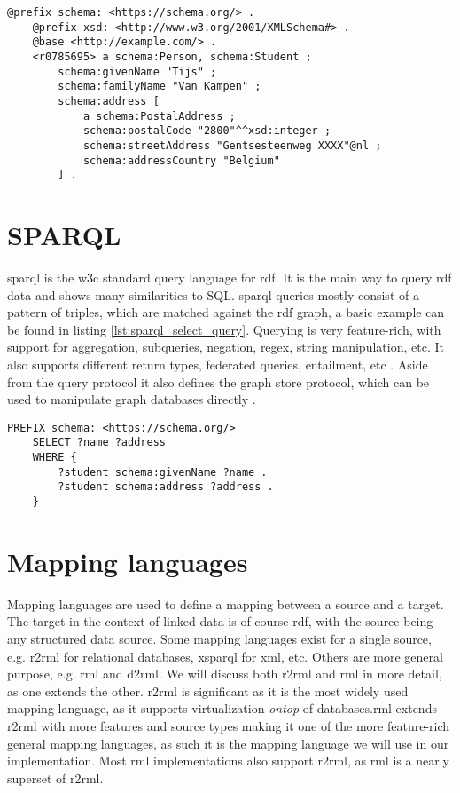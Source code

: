\begin{lstlisting}[caption={Basic turtle document using turtle features}, label={lst:basic_turtle_example_concise}, captionpos=b, breaklines=true]
    @prefix schema: <https://schema.org/> .
    @prefix xsd: <http://www.w3.org/2001/XMLSchema#> .
    @base <http://example.com/> .
    <r0785695> a schema:Person, schema:Student ;
        schema:givenName "Tijs" ;
        schema:familyName "Van Kampen" ;
        schema:address [
            a schema:PostalAddress ;
            schema:postalCode "2800"^^xsd:integer ;
            schema:streetAddress "Gentsesteenweg XXXX"@nl ;
            schema:addressCountry "Belgium"
        ] .
\end{lstlisting}


\section{SPARQL}
\acrfull{sparql} is the \acrshort{w3c} standard query language for \acrshort{rdf}. It is the main way to query \acrshort{rdf} data and shows many similarities to SQL. \acrshort{sparql} queries mostly consist of a pattern of triples, which are matched against the \acrshort{rdf} graph, a basic example can be found in listing \ref{lst:sparql_select_query}. Querying is very feature-rich, with support for aggregation, subqueries, negation, regex, string manipulation, etc. It also supports different return types, federated queries, entailment, etc \citep{SPARQL1.1QL}. Aside from the query protocol it also defines the graph store protocol, which can be used to manipulate graph databases directly \citep{SPARQL1.1}.

\begin{lstlisting}[language=SPARQL, caption={Example of a basic \acrshort{sparql} SELECT query}, label={lst:sparql_select_query}, captionpos=b]
    PREFIX schema: <https://schema.org/>
    SELECT ?name ?address
    WHERE {
        ?student schema:givenName ?name .
        ?student schema:address ?address .
    }
\end{lstlisting}

\section{Mapping languages}
Mapping languages are used to define a mapping between a source and a target. The target in the context of linked data is of course \acrshort{rdf}, with the source being any structured data source. Some mapping languages exist for a single source, e.g. \acrfull{r2rml} for relational databases, \acrfull{xsparql} for \acrshort{xml}, etc. Others are more general purpose, e.g. \acrfull{rml} and \acrfull{d2rml}.
We will discuss both \acrshort{r2rml} and \acrshort{rml} in more detail, as one extends the other. \acrshort{r2rml} is significant as it is the most widely used mapping language, as it supports virtualization \textit{ontop} of databases.\acrshort{rml} extends \acrshort{r2rml} with more features and source types making it one of the more feature-rich general mapping languages, as such it is the mapping language we will use in our implementation. 
Most \acrshort{rml} implementations also support \acrshort{r2rml}, as \acrshort{rml} is a nearly superset of \acrshort{r2rml}.

